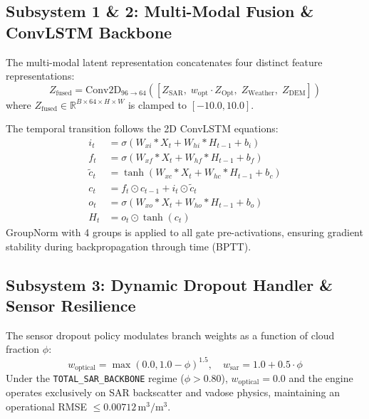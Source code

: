 \documentclass[11pt,a4paper]{article}
\theoremstyle{definition}
\theoremstyle{remark}
\begin{document}
\subsection{Subsystem 1 \& 2: Multi-Modal Fusion \& ConvLSTM Backbone}
The multi-modal latent representation concatenates four distinct feature representations:
\begin{equation}
    Z_{\text{fused}} = \text{Conv2D}_{96 \to 64}\left([Z_{\text{SAR}}, \; w_{\text{opt}} \cdot Z_{\text{Opt}}, \; Z_{\text{Weather}}, \; Z_{\text{DEM}}]\right)
\end{equation}
where $Z_{\text{fused}} \in \mathbb{R}^{B \times 64 \times H \times W}$ is clamped to $[-10.0, 10.0]$.

The temporal transition follows the 2D ConvLSTM equations:
\begin{align}
    i_t &= \sigma\left(W_{xi} * X_t + W_{hi} * H_{t-1} + b_i\right) \\
    f_t &= \sigma\left(W_{xf} * X_t + W_{hf} * H_{t-1} + b_f\right) \\
    \tilde{c}_t &= \tanh\left(W_{xc} * X_t + W_{hc} * H_{t-1} + b_c\right) \\
    c_t &= f_t \odot c_{t-1} + i_t \odot \tilde{c}_t \\
    o_t &= \sigma\left(W_{xo} * X_t + W_{ho} * H_{t-1} + b_o\right) \\
    H_t &= o_t \odot \tanh(c_t)
\end{align}
GroupNorm with 4 groups is applied to all gate pre-activations, ensuring gradient stability during backpropagation through time (BPTT).

\subsection{Subsystem 3: Dynamic Dropout Handler & Sensor Resilience}
The sensor dropout policy modulates branch weights as a function of cloud fraction $\phi$:
\begin{equation}
    w_{\text{optical}} = \max(0.0, 1.0 - \phi)^{1.5}, \quad w_{\text{sar}} = 1.0 + 0.5 \cdot \phi
\end{equation}
Under the \texttt{TOTAL\_SAR\_BACKBONE} regime ($\phi > 0.80$), $w_{\text{optical}} = 0.0$ and the engine operates exclusively on SAR backscatter and vadose physics, maintaining an operational RMSE $\le 0.00712\,\text{m}^3/\text{m}^3$.
\end{document}

